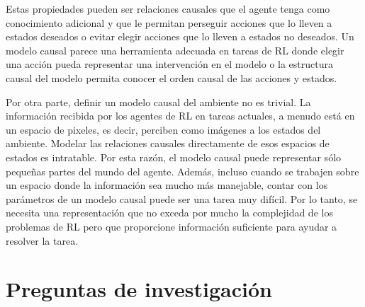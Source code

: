 Estas propiedades pueden ser relaciones causales 
que el agente tenga como conocimiento adicional
y que le permitan perseguir acciones que lo lleven a
estados deseados o evitar elegir acciones que lo lleven a 
estados no deseados. Un modelo causal parece una herramienta adecuada en
tareas de RL donde elegir una acción pueda representar una intervención en el modelo o la estructura causal del modelo permita conocer el orden causal de las acciones y estados.

Por otra parte, definir un modelo causal del ambiente no es trivial.
La información recibida por los agentes de RL en tareas actuales, a menudo está en un espacio de pixeles, es decir, perciben como imágenes a los estados del ambiente. Modelar las relaciones causales directamente de esos espacios de estados es intratable.
Por esta razón, el modelo causal puede representar sólo pequeñas partes del mundo del agente. Además, incluso cuando se trabajen sobre un espacio donde la información sea 
mucho más manejable, contar con los parámetros de un modelo causal puede ser una tarea muy difícil. Por lo tanto, se necesita una representación que no exceda por mucho la complejidad de los problemas de RL pero que proporcione información suficiente para ayudar a resolver la tarea.








\section{Preguntas de investigación}

